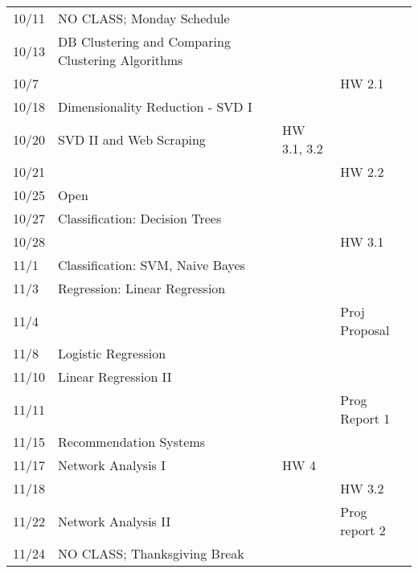 \documentclass[11pt]{article}
\begin{document}
\begin{centering}
\begin{tabular}{||l|p{3in}|l|l|l||}
10/11 &  NO CLASS; Monday Schedule &  & &  \\   
10/13 & DB Clustering and Comparing Clustering Algorithms & & & \\
10/7 &&&& HW 2.1 \\
\hline

10/18 & Dimensionality Reduction - SVD I &&&\\
%
10/20 & SVD II and Web Scraping & & HW 3.1, 3.2 & \\ 
10/21 &&&& HW 2.2 \\

\hline

10/25 & Open & &  & \\ 
10/27 & Classification: Decision Trees & & & \\ 
10/28 &&&& HW 3.1 \\
\hline

11/1 & Classification: SVM, Naive Bayes &  &  &\\ 
11/3 & Regression: Linear Regression & & &\\ 
11/4 &&&& Proj Proposal\\
\hline

11/8 & Logistic Regression & & &\\ 
11/10 & Linear Regression II & & & \\ 
11/11 &&&& Prog Report 1\\
\hline

11/15 & Recommendation Systems & & &\\ 
11/17 & Network Analysis I & & HW 4 & \\
11/18 &&&& HW 3.2\\
\hline

11/22 & Network Analysis II &  & &Prog report 2\\ 
11/24 & NO CLASS; Thanksgiving Break  & & & \\ 
 \hline


\end{tabular}
\end{centering}
\end{document}

